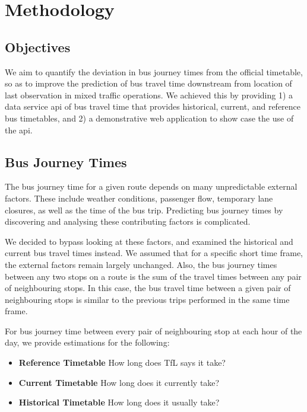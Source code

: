 \chapter{Methodology}
\label{ch:concept_design}
\section{Objectives}
\par We aim to quantify the deviation in bus journey times from the official timetable, so as to improve the prediction of bus travel time downstream from location of last observation in mixed traffic operations. We achieved this by providing 1) a data service \acrshort{api} of bus travel time that provides historical, current, and reference bus timetables, and 2) a demonstrative web application to show case the use of the \acrshort{api}.

\section{Bus Journey Times}
\par The bus journey time for a given route depends on many unpredictable external factors. These include weather conditions, passenger flow, temporary lane closures, as well as the time of the bus trip. Predicting bus journey times by discovering and analysing these contributing factors is complicated.

\par We decided to bypass looking at these factors, and examined the historical and current bus travel times instead. We assumed that for a specific short time frame, the external factors remain largely unchanged. Also, the bus journey times between any two stops on a route is the sum of the travel times between any pair of neighbouring stops. In this case, the bus travel time between a given pair of neighbouring stops is similar to the previous trips performed in the same time frame.

\par For bus journey time between every pair of neighbouring stop at each hour of the day, we provide estimations for the following:
\begin{itemize}
  \item \textbf{Reference Timetable} How long does TfL says it take?
  \item \textbf{Current Timetable} How long does it currently take?
  \item \textbf{Historical Timetable} How long does it usually take?
\end{itemize}

